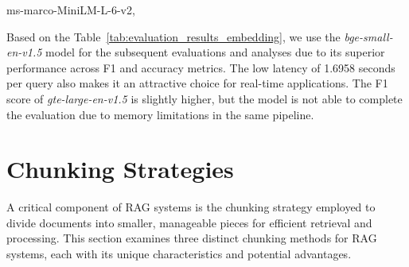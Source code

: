 \begin{table}[h!]
    \centering
    \noindent
    \caption{Performance evaluation of various embedding models on the FactBench dataset, using the Gemma2 model.}
    {\scriptsize ms-marco-MiniLM-L-6-v2,}\\
    \label{tab:evaluation_results_embedding}
\end{table}

Based on the Table~\ref{tab:evaluation_results_embedding}, we use the \textit{bge-small-en-v1.5} model for the subsequent evaluations and analyses due to its superior performance across F1 and accuracy metrics.
The low latency of 1.6958 seconds per query also makes it an attractive choice for real-time applications.
The F1 score of \textit{gte-large-en-v1.5} is slightly higher, but the model is not able to complete the evaluation due to memory limitations in the same pipeline.

\section{Chunking Strategies}\label{sec:chunking-strategies}
A critical component of \ac{RAG} systems is the chunking strategy employed to divide documents into smaller, manageable pieces for efficient retrieval and processing.
This section examines three distinct chunking methods for \ac{RAG} systems, each with its unique characteristics and potential advantages.

